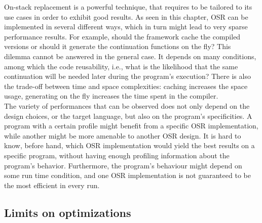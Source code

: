 On-stack replacement is a powerful technique, that requires to be tailored to its use cases in order to exhibit good results.
As seen in this chapter, OSR can be implemented in several different ways, which in turn might lead to very sparse performance results.
For example, should the framework cache the compiled versions or should it generate the continuation functions on the fly?
This dilemma cannot be answered in the general case.
It depends on many conditions, among which the code reusability, i.e., what is the likelihood that the same continuation will be needed later during the program's execution?
There is also the trade-off between time and space complexities: caching increases the space usage, generating on the fly increases the time spent in the compiler.\\

The variety of performances that can be observed does not only depend on the design choices, or the target language, but also on the program's specificities.
A program with a certain profile might benefit from a specific OSR implementation, while another might be more amenable to another OSR design.
It is hard to know, before hand, which OSR implementation would yield the best results on a specific program, without having enough profiling information about the program's behavior. 
Furthermore, the program's behaviour might depend on some run time condition, and one OSR implementation is not guaranteed to be the most efficient in every run.  



\subsection{Limits on optimizations}

